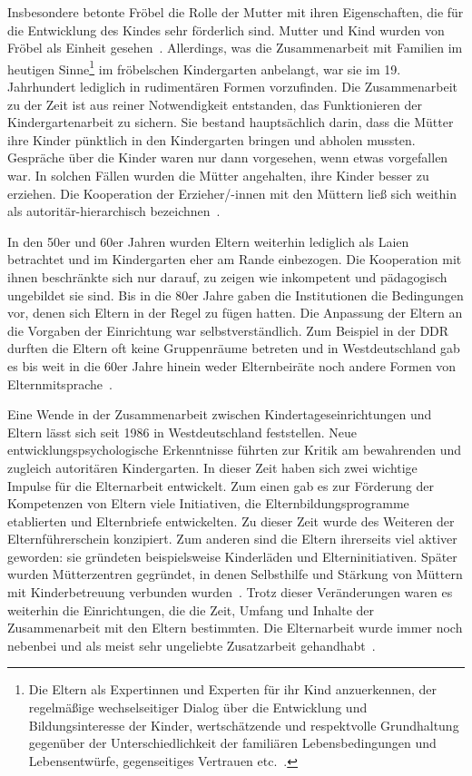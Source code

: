 \documentclass[12pt,a4paper]{article}
\begin{document}
Insbesondere betonte Fröbel die Rolle der Mutter mit ihren Eigenschaften, die für die Entwicklung des Kindes sehr förderlich sind. Mutter und Kind wurden von Fröbel als Einheit gesehen~\parencite[S.~19-20]{Herrmann}. Allerdings, was die Zusammenarbeit mit Familien im heutigen Sinne\footnote{Die Eltern als Expertinnen und Experten für ihr Kind anzuerkennen, der regelmäßige wechselseitiger Dialog über die Entwicklung und Bildungsinteresse der Kinder, wertschätzende und respektvolle Grundhaltung gegenüber der Unterschiedlichkeit der familiären Lebensbedingungen und Lebensentwürfe, gegenseitiges Vertrauen etc.~\parencite[S.~25-28]{Kieschnick}.} im fröbelschen Kindergarten  anbelangt, war sie im 19. Jahrhundert lediglich in rudimentären Formen vorzufinden. Die Zusammenarbeit zu der Zeit ist aus reiner Notwendigkeit entstanden, das Funktionieren der Kindergartenarbeit zu sichern. Sie bestand hauptsächlich darin,  dass die Mütter ihre Kinder pünktlich in den Kindergarten bringen und abholen mussten. Gespräche über die Kinder waren nur dann vorgesehen, wenn etwas vorgefallen war. In solchen Fällen wurden die Mütter angehalten, ihre Kinder besser zu erziehen. Die Kooperation der Erzieher/-innen mit den Müttern ließ sich weithin als autoritär-hierarchisch bezeichnen~\parencite[S.~82-83]{Thiersch_2006}.

	In den 50er und 60er Jahren wurden Eltern weiterhin lediglich als Laien betrachtet und im Kindergarten eher am Rande einbezogen. Die Kooperation mit ihnen beschränkte sich nur darauf, zu zeigen wie inkompetent und pädagogisch ungebildet sie sind. Bis in die 80er Jahre gaben die Institutionen die Bedingungen vor, denen sich Eltern in der Regel zu fügen hatten. Die Anpassung der Eltern an die Vorgaben der Einrichtung war selbstverständlich. Zum Beispiel in der DDR durften die Eltern oft keine Gruppenräume betreten und in Westdeutschland gab es bis weit in die 60er Jahre hinein weder Elternbeiräte noch andere Formen von Elternmitsprache~\parencite[S.~22]{Klein}.
	
	Eine Wende in der Zusammenarbeit zwischen Kindertageseinrichtungen und Eltern lässt sich seit 1986 in Westdeutschland feststellen. Neue entwicklungspsychologische Erkenntnisse führten zur Kritik am bewahrenden und zugleich autoritären Kindergarten. In dieser Zeit haben sich zwei wichtige Impulse für die Elternarbeit entwickelt. Zum einen gab es zur Förderung der Kompetenzen von Eltern viele Initiativen, die Elternbildungsprogramme etablierten und Elternbriefe entwickelten. Zu dieser Zeit wurde des Weiteren der Elternführerschein konzipiert. Zum anderen sind die Eltern ihrerseits viel aktiver geworden: sie gründeten beispielsweise Kinderläden und Elterninitiativen. Später wurden Mütterzentren gegründet, in denen Selbsthilfe und Stärkung von Müttern mit Kinderbetreuung verbunden wurden~\parencite[S.~86]{Thiersch_2006}. Trotz dieser Veränderungen waren es weiterhin die Einrichtungen, die die Zeit, Umfang und Inhalte der Zusammenarbeit mit den Eltern bestimmten. Die Elternarbeit wurde immer noch nebenbei und als meist sehr ungeliebte Zusatzarbeit gehandhabt~\parencite[S.~23-24]{Klein}.
	
\end{document}
